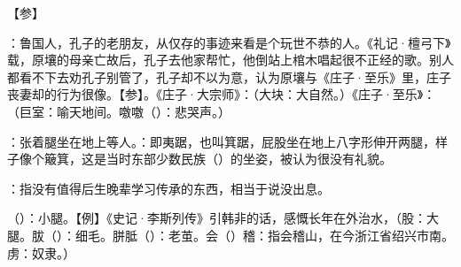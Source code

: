 {【参】}
{}


{
\item {}：鲁国人，孔子的老朋友，从仅存的事迹来看是个玩世不恭的人。《礼记·檀弓下》载，原壤的母亲亡故后，孔子去他家帮忙，他倒站上棺木唱起很不正经的歌。别人都看不下去劝孔子别管了，孔子却不以为意，认为原壤与《庄子·至乐》里，庄子丧妻却的行为很像。【参】。《庄子·大宗师》：（大块：大自然。）《庄子·至乐》：（巨室：喻天地间。噭噭（）：悲哭声。）

\item {}：张着腿坐在地上等人。：即夷踞，也叫箕踞，屁股坐在地上八字形伸开两腿，样子像个簸箕，这是当时东部少数民族（）的坐姿，被认为很没有礼貌。
\item {}：指没有值得后生晚辈学习传承的东西，相当于说没出息。
\item {}（）：小腿。【例】《史记·李斯列传》引韩非的话，感慨长年在外治水，（股：大腿。胈（）：细毛。胼胝（）：老茧。会（）稽：指会稽山，在今浙江省绍兴市南。虏：奴隶。）
}
{}


